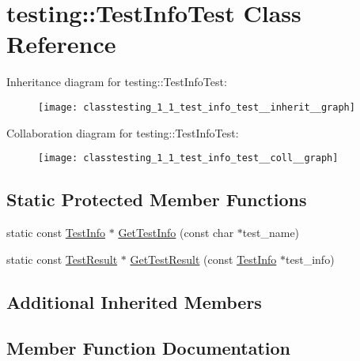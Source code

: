 \hypertarget{classtesting_1_1_test_info_test}{}\section{testing\+:\+:Test\+Info\+Test Class Reference}
\label{classtesting_1_1_test_info_test}


Inheritance diagram for testing\+:\+:Test\+Info\+Test\+:
\nopagebreak
\begin{figure}[H]
\begin{center}
\leavevmode
\texttt{[image: classtesting\_1\_1\_test\_info\_test\_\_inherit\_\_graph]}
\end{center}
\end{figure}


Collaboration diagram for testing\+:\+:Test\+Info\+Test\+:
\nopagebreak
\begin{figure}[H]
\begin{center}
\leavevmode
\texttt{[image: classtesting\_1\_1\_test\_info\_test\_\_coll\_\_graph]}
\end{center}
\end{figure}
\subsection*{Static Protected Member Functions}
\begin{DoxyCompactItemize}
\item 
static const \hyperlink{classtesting_1_1_test_info}{Test\+Info} $\ast$ \hyperlink{classtesting_1_1_test_info_test_a4140c1302bf53c7f1375a23923624f04}{Get\+Test\+Info} (const char $\ast$test\+\_\+name)
\item 
static const \hyperlink{classtesting_1_1_test_result}{Test\+Result} $\ast$ \hyperlink{classtesting_1_1_test_info_test_a154b3679b1aa00ad037ce46eb60d18c3}{Get\+Test\+Result} (const \hyperlink{classtesting_1_1_test_info}{Test\+Info} $\ast$test\+\_\+info)
\end{DoxyCompactItemize}
\subsection*{Additional Inherited Members}


\subsection{Member Function Documentation}
